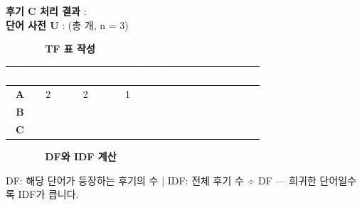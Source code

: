 \documentclass[a4paper,11pt]{article}
\begin{document}
\noindent\textbf{후기 C 처리 결과} : \enspace
\dotfill
\\[3pt]
\noindent\textbf{단어 사전 U} : \enspace
\dotfill
\quad\small\color{gray}(총 \hspace{25mm} 개, n = 3)
\\[3pt]
\par\vspace{3mm}
\noindent
\colorbox{badgegray}{\textcolor{white}{\small\bfseries STEP 2}}\enspace\textbf{TF 표 작성}
\par\vspace{1mm}
\begin{center}
\renewcommand{\arraystretch}{1.4}
\begin{tabular}{|c|c|c|c|c|c|c|c|}
\hline
\cellcolor{badgegray}\textcolor{white}{\small\bfseries 후기} & \cellcolor{badgegray}\textcolor{white}{\small\bfseries 영화} & \cellcolor{badgegray}\textcolor{white}{\small\bfseries 재미있다} & \cellcolor{badgegray}\textcolor{white}{\small\bfseries 스토리} & \cellcolor{badgegray}\textcolor{white}{\small\bfseries 연기} & \cellcolor{badgegray}\textcolor{white}{\small\bfseries 좋다} & \cellcolor{badgegray}\textcolor{white}{\small\bfseries 음악} & \cellcolor{badgegray}\textcolor{white}{\small\bfseries 작품} \\ \hline
\cellcolor{stepbg}\bfseries A & \cellcolor{stepbg} 2 & \cellcolor{stepbg} 2 & \cellcolor{stepbg} 1 &  &  &  &  \\ \hline
\cellcolor{stepbg}\bfseries B &  &  &  &  &  &  &  \\ \hline
\cellcolor{stepbg}\bfseries C &  &  &  &  &  &  &  \\ \hline
\end{tabular}
\end{center}
\par\vspace{3mm}
\noindent
\colorbox{badgegray}{\textcolor{white}{\small\bfseries STEP 3}}\enspace\textbf{DF와 IDF 계산}
\par\vspace{1mm}
\begin{tcolorbox}[colback=stepbg,colframe=gray!50,boxrule=0.3pt,left=5pt,right=5pt,top=2pt,bottom=2pt]
\noindent\small DF: 해당 단어가 등장하는 후기의 수  |  IDF: 전체 후기 수 ÷ DF — 희귀한 단어일수록 IDF가 큽니다.\\
\end{tcolorbox}
\vspace{1mm}
\end{document}
